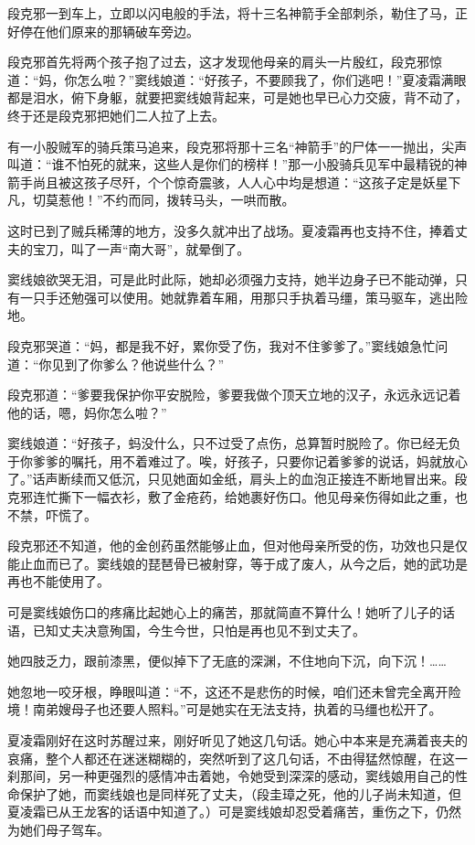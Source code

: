 \documentclass[12pt,oneside]{book}
\begin{document}
段克邪一到车上，立即以闪电般的手法，将十三名神箭手全部刺杀，勒住了马，正好停在他们原来的那辆破车旁边。

段克邪首先将两个孩子抱了过去，这才发现他母亲的肩头一片殷红，段克邪惊道：``妈，你怎么啦？''窦线娘道：``好孩子，不要顾我了，你们逃吧！''夏凌霜满眼都是泪水，俯下身躯，就要把窦线娘背起来，可是她也早已心力交疲，背不动了，终于还是段克邪把她们二人拉了上去。

有一小股贼军的骑兵策马追来，段克邪将那十三名``神箭手''的尸体一一抛出，尖声叫道：``谁不怕死的就来，这些人是你们的榜样！''那一小股骑兵见军中最精锐的神箭手尚且被这孩子尽歼，个个惊奇震骇，人人心中均是想道：``这孩子定是妖星下凡，切莫惹他！''不约而同，拨转马头，一哄而散。

这时已到了贼兵稀薄的地方，没多久就冲出了战场。夏凌霜再也支持不住，捧着丈夫的宝刀，叫了一声``南大哥''，就晕倒了。

窦线娘欲哭无泪，可是此时此际，她却必须强力支持，她半边身子已不能动弹，只有一只手还勉强可以使用。她就靠着车厢，用那只手执着马缰，策马驱车，逃出险地。

段克邪哭道：``妈，都是我不好，累你受了伤，我对不住爹爹了。''窦线娘急忙问道：``你见到了你爹么？他说些什么？''

段克邪道：``爹要我保护你平安脱险，爹要我做个顶天立地的汉子，永远永远记着他的话，嗯，妈你怎么啦？''

窦线娘道：``好孩子，蚂没什么，只不过受了点伤，总算暂时脱险了。你已经无负于你爹爹的嘱托，用不着难过了。唉，好孩子，只要你记着爹爹的说话，妈就放心了。''话声断续而又低沉，只见她面如金纸，肩头上的血泡正接连不断地冒出来。段克邪连忙撕下一幅衣衫，敷了金疮药，给她裹好伤口。他见母亲伤得如此之重，也不禁，吓慌了。

段克邪还不知道，他的金创药虽然能够止血，但对他母亲所受的伤，功效也只是仅能止血而已了。窦线娘的琵琶骨已被射穿，等于成了废人，从今之后，她的武功是再也不能使用了。

可是窦线娘伤口的疼痛比起她心上的痛苦，那就简直不算什么！她听了儿子的话语，已知丈夫决意殉国，今生今世，只怕是再也见不到丈夫了。

她四肢乏力，跟前漆黑，便似掉下了无底的深渊，不住地向下沉，向下沉！\ldots\ldots{}

她忽地一咬牙根，睁眼叫道：``不，这还不是悲伤的时候，咱们还未曾完全离开险境！南弟嫂母子也还要人照料。''可是她实在无法支持，执着的马缰也松开了。

夏凌霜刚好在这时苏醒过来，刚好听见了她这几句话。她心中本来是充满着丧夫的哀痛，整个人都还在迷迷糊糊的，突然听到了这几句话，不由得猛然惊醒，在这一刹那间，另一种更强烈的感情冲击着她，令她受到深深的感动，窦线娘用自己的性命保护了她，而窦线娘也是同样死了丈夫，（段圭璋之死，他的儿子尚未知道，但夏凌霜已从王龙客的话语中知道了。）可是窦线娘却忍受着痛苦，重伤之下，仍然为她们母子驾车。
\end{document}
